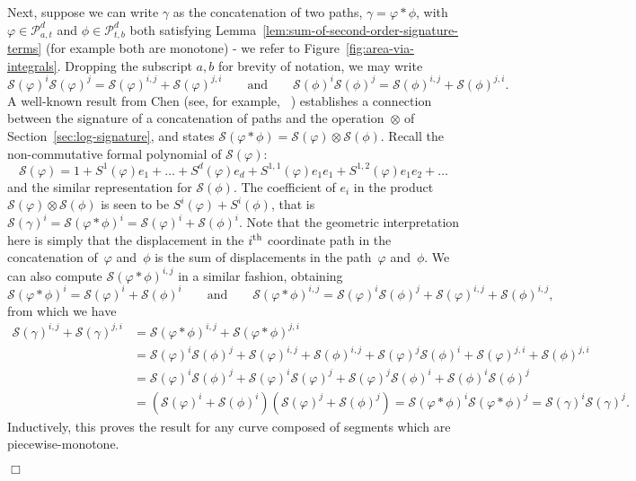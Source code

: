 \documentclass{amsart}[11pt]
\numberwithin{equation}{section}
\theoremstyle{definition}
\newcommand{\Pp}{\mathcal{P}}
\newcommand{\Ss}{\mathcal{S}}
\newcommand{\tens} {\mathbin{\mathop{\otimes}}}
\begin{document}
{Next, suppose we can write $\gamma$ as the concatenation of two paths, $\gamma = \varphi \ast \phi$, with $\varphi\in\Pp_{a,t}^d$ and $\phi\in\Pp_{t,b}^d$ both satisfying Lemma~\ref{lem:sum-of-second-order-signature-terms} (for example both are monotone) - we refer to Figure~\ref{fig:area-via-integrals}. Dropping the subscript $a, b$ for brevity of notation, we may write
$$
\Ss(\varphi)^i\Ss(\varphi)^j = \Ss(\varphi)^{i, j} + \Ss(\varphi)^{j, i}
\qquad\text{and}\qquad
\Ss(\phi)^i\Ss(\phi)^j = \Ss(\phi)^{i, j} + \Ss(\phi)^{j, i}.
$$
A well-known result from Chen (see, for example, ~\cite[Section 1.3.3]{Chevyrev16}) establishes a connection between the signature of a concatenation of paths and the operation~$\tens$ of Section~\ref{sec:log-signature}, and states $\Ss(\varphi\ast \phi) = \Ss(\varphi) \tens \Ss(\phi)$.
Recall the non-commutative formal polynomial of $\Ss(\varphi)$:
\begin{equation}
    \Ss(\varphi) = 1 + S^1(\varphi)e_1 + \ldots + S^d(\varphi)e_d + S^{1,1}(\varphi)e_1e_1 + S^{1,2}(\varphi)e_1e_2 + \ldots
\end{equation}
and the similar representation for $\Ss(\phi)$. The coefficient of $e_i$ in the product $\Ss(\varphi) \tens \Ss(\phi)$ is seen to be $S^i(\varphi) + S^i(\phi)$, that is $\Ss(\gamma)^i = \Ss(\varphi \ast \phi)^i = \Ss(\varphi)^i + \Ss(\phi)^i$. Note that the geometric interpretation here is simply that the displacement in the $i\textsuperscript{th}$ coordinate path in the concatenation of~$\varphi$ and~$\phi$ is the sum of displacements in the path~$\varphi$ and~$\phi$.
We can also compute $\Ss(\varphi\ast \phi)^{i, j}$ in a similar fashion, obtaining
$$
\Ss(\varphi\ast \phi)^i = \Ss(\varphi)^i + \Ss(\phi)^i
\qquad\text{and}\qquad
\Ss(\varphi\ast \phi)^{i, j} = \Ss(\varphi)^{i}\Ss(\phi)^{j} + \Ss(\varphi)^{i,j} + \Ss(\phi)^{i,j},
$$
from which we have
    \begin{align*}
\Ss(\gamma)^{i,j} + \Ss(\gamma)^{j, i} &= \Ss(\varphi\ast \phi)^{i, j} + \Ss(\varphi\ast \phi)^{j, i} \\
&= \Ss(\varphi)^i \Ss(\phi)^j + \Ss(\varphi)^{i, j} + \Ss(\phi)^{i, j} + \Ss(\varphi)^j \Ss(\phi)^i + \Ss(\varphi)^{j, i} + \Ss(\phi)^{j, i} \\
&= \Ss(\varphi)^i \Ss(\phi)^j + \Ss(\varphi)^i \Ss(\varphi)^j + \Ss(\varphi)^j \Ss(\phi)^i + \Ss(\phi)^i \Ss(\phi)^j \\
&= (\Ss(\varphi)^i + \Ss(\phi)^i)(\Ss(\varphi)^j + \Ss(\phi)^j)
= \Ss(\varphi\ast \phi)^i \Ss(\varphi\ast \phi)^j
= \Ss(\gamma)^i \Ss(\gamma)^j.
    \end{align*}
Inductively, this proves the result for any curve composed of segments which are piecewise-monotone.
}

\hfill \ensuremath{\Box}




\end{document}
